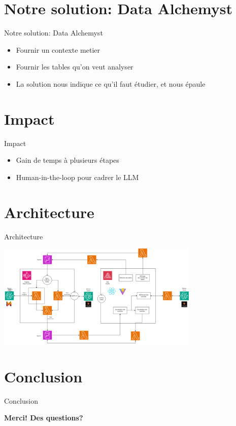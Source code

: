 \documentclass{beamer}
\begin{document}
\section{Notre solution: Data Alchemyst}
\begin{frame}{Notre solution: Data Alchemyst}
	\vspace*{-1cm}
	\begin{itemize}
		\item Fournir un contexte metier
		\item Fournir les tables qu'on veut analyser
		\item La solution nous indique ce qu'il faut étudier, et nous épaule
	\end{itemize}
\end{frame}




\section{Impact}
\begin{frame}{Impact}
	\vspace*{-1cm}
	\begin{itemize}
		\item Gain de temps à plusieurs étapes
		\item Human-in-the-loop pour cadrer le LLM
	\end{itemize}
\end{frame}

\section{Architecture}
\begin{frame}{Architecture}
	\begin{center}
	\includegraphics[height=5cm]{archi_AWS.drawio.png}
	\end{center}
\end{frame}



\section{Conclusion}
\begin{frame}{Conclusion}
	\begin{center}
	\textbf{Merci! Des questions?}
	\end{center}
\end{frame}
\end{document}
